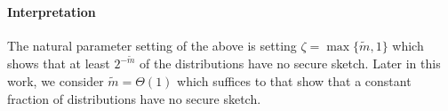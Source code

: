 \paragraph{Interpretation}
The natural parameter setting of the above is setting $\zeta = \max\{\tilde{m},1\} $ which shows that at least $2^{-\tilde{m}}$ of the distributions have no secure sketch.  Later in this work, we consider $\tilde{m} = \Theta(1)$ which suffices to that show that a constant fraction of distributions have no secure sketch.




